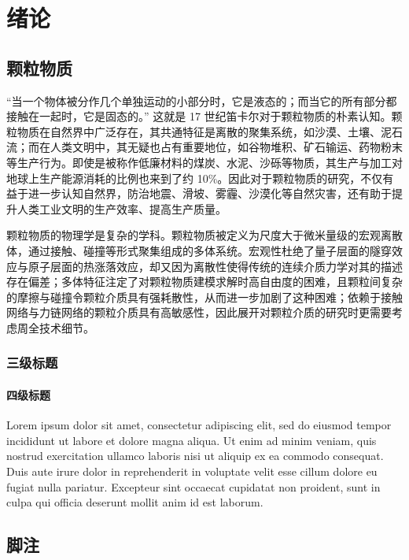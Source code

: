 
\chapter{绪论}

\section{颗粒物质}

“当一个物体被分作几个单独运动的小部分时，它是液态的；而当它的所有部分都接触在一起时，它是固态的。” 这就是 17 世纪笛卡尔对于颗粒物质的朴素认知。颗粒物质在自然界中广泛存在，其共通特征是离散的聚集系统，如沙漠、土壤、泥石流；而在人类文明中，其无疑也占有重要地位，如谷物堆积、矿石输运、药物粉末等生产行为。即使是被称作低廉材料的煤炭、水泥、沙砾等物质，其生产与加工对地球上生产能源消耗的比例也来到了约 \num{10}\%\cite{duran2000sands}。因此对于颗粒物质的研究，不仅有益于进一步认知自然界，防治地震、滑坡、雾霾、沙漠化等自然灾害，还有助于提升人类工业文明的生产效率、提高生产质量。

颗粒物质的物理学是复杂的学科。颗粒物质被定义为尺度大于微米量级的宏观离散体，通过接触、碰撞等形式聚集组成的多体系统。宏观性杜绝了量子层面的隧穿效应与原子层面的热涨落效应，却又因为离散性使得传统的连续介质力学对其的描述存在偏差；多体特征注定了对颗粒物质建模求解时高自由度的困难，且颗粒间复杂的摩擦与碰撞令颗粒介质具有强耗散性，从而进一步加剧了这种困难；依赖于接触网络与力链网络的颗粒介质具有高敏感性，因此展开对颗粒介质的研究时更需要考虑周全技术细节。



\subsection{三级标题}

\subsubsection{四级标题}

Lorem ipsum dolor sit amet, consectetur adipiscing elit, sed do eiusmod tempor
incididunt ut labore et dolore magna aliqua. Ut enim ad minim veniam, quis
nostrud exercitation ullamco laboris nisi ut aliquip ex ea commodo consequat.
Duis aute irure dolor in reprehenderit in voluptate velit esse cillum dolore eu
fugiat nulla pariatur. Excepteur sint occaecat cupidatat non proident, sunt in
culpa qui officia deserunt mollit anim id est laborum.

\section{脚注}

